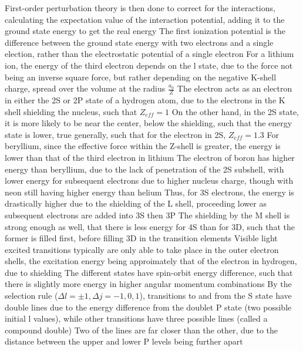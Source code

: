 \documentclass[11 pt, twoside]{article}
\newenvironment{outline*}
{
	\begin{outline}[enumerate]
	}
	{\end{outline}
}
\begin{document}
\begin{outline*}
		\3 First-order perturbation theory is then done to correct for the interactions, calculating the expectation value of the interaction potential, adding it to the ground state energy to get the real energy
	\2 The first ionization potential is the difference between the ground state energy with two electrons and a single election, rather than the electrostatic potential of a single electron
\1 For a lithium ion, the energy of the third electron depends on the l state, due to the force not being an inverse square force, but rather depending on the negative K-shell charge, spread over the volume at the radius $\frac{a_0}{Z}$
	\2 The electron acts as an electron in either the 2S or 2P state of a hydrogen atom, due to the electrons in the K shell shielding the nucleus, such that $Z_{eff} = 1$
		\3 On the other hand, in the 2S state, it is more likely to be near the center, below the shielding, such that the energy state is lower, true generally, such that for the electron in 2S, $Z_{eff} = 1.3$
	\2 For beryllium, since the effective force within the Z-shell is greater, the energy is lower than that of the third electron in lithium
	\2 The electron of boron has higher energy than beryllium, due to the lack of penetration of the 2S subshell, with lower energy for subsequent electrons due to higher nucleus charge, though with neon still having higher energy than helium 
	\2 Thus, for 3S electrons, the energy is drastically higher due to the shielding of the L shell, proceeding lower as subsequent electrons are added into 3S then 3P
	\2 The shielding by the M shell is strong enough as well, that there is less energy for 4S than for 3D, such that the former is filled first, before filling 3D in the transition elements
\1 Visible light excited transitions typically are only able to take place in the outer electron shells, the excitation energy being approimately that of the electron in hydrogen, due to shielding
	\2 The different states have spin-orbit energy difference, such that there is slightly more energy in higher angular momentum combinations
	\2 By the selection rule ($\Delta l = \pm 1, \Delta j = -1, 0, 1$), transitions to and from the S state have double lines due to the energy difference from the doublet P state (two possible initial l values), while other transitions have three possible lines (called a compound double)
		\3 Two of the lines are far closer than the other, due to the distance between the upper and lower P levels being further apart
\end{outline*}
\end{document}
